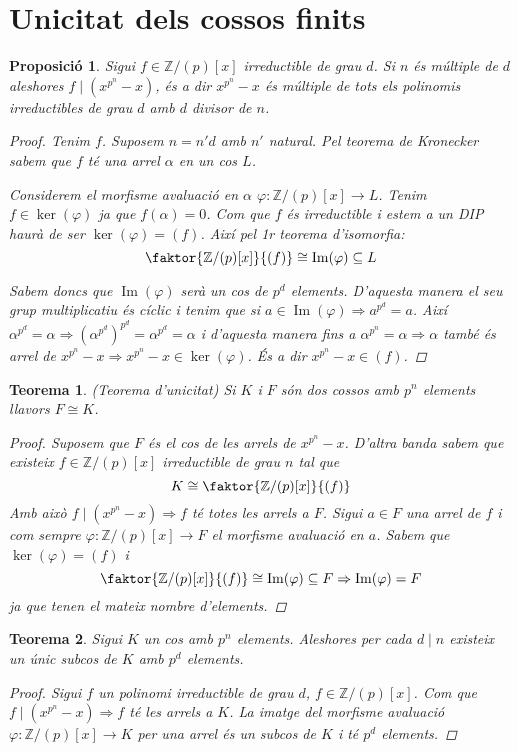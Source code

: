 \documentclass[a4paper,11pt]{report}
\renewcommand{\div}{\mid}
\newcommand{\im}{\Rightarrow}
\theoremstyle{theorem}
\newtheorem{proposicio}{\normalfont \sffamily\bfseries Proposició}[section]
\newtheorem{teorema}{\normalfont \sffamily\bfseries Teorema}[section]
\theoremstyle{definition}
\DeclareMathOperator{\ima}{Im}
\begin{document}
\section{Unicitat dels cossos finits}
\begin{proposicio}
	Sigui $f\in\mathbb{Z}/(p)[x]$ irreductible de grau $d$. Si $n$ és múltiple de $d$ aleshores $f\div (x^{p^n}-x)$, és a dir $x^{p^n}-x$ és múltiple de tots els polinomis irreductibles de grau $d$ amb $d$ divisor de $n$.\begin{proof}
	 Tenim $f$. Suposem $n=n'd$ amb $n'$ natural. Pel teorema de Kronecker sabem que $f$ té una arrel $\alpha$ en un cos $L$.
	 
	 Considerem el morfisme avaluació en $\alpha$ $\varphi: \mathbb{Z}/(p)[x]\longrightarrow L$. Tenim $f\in \ker(\varphi)$ ja que $f(\alpha)=0$. Com que $f$ és irreductible i estem a un DIP haurà de ser $\ker(\varphi)=(f)$. Així pel 1r teorema d'isomorfia:
	 $$\faktor{\mathbb{Z}/(p)[x]}{(f)}\cong \ima(\varphi)\subseteq L$$
	 
	 Sabem doncs que $\ima(\varphi)$ serà un cos de $p^d$ elements. D'aquesta manera el seu grup multiplicatiu és cíclic i tenim que si $a\in\ima(\varphi)\im a^{p^d}=a$. Així $\alpha^{p^d}=\alpha\im (\alpha^{p^d})^{p^d}= \alpha^{p^d}=\alpha$ i d'aquesta manera fins a $\alpha^{p^n}=\alpha\im \alpha$ també és arrel de $x^{p^n}-x\im x^{p^n}-x\in\ker(\varphi)$. És a dir $x^{p^n}-x\in (f)$.
	\end{proof}
\end{proposicio}
\begin{teorema}(Teorema d'unicitat)
 Si $K$ i $F$ són dos cossos amb $p^n$ elements llavors $F\cong K$.
 \begin{proof}
 	Suposem que $F$ és el cos de les arrels de $x^{p^n}-x$. D'altra banda sabem que existeix $f\in \mathbb{Z}/(p)[x]$ irreductible de grau $n$ tal que $$K\cong \faktor{\mathbb{Z}/(p)[x]}{(f)}$$
 	Amb això $f\div (x^{p^n}-x)\im f$ té totes les arrels a $F$. Sigui $a\in F$ una arrel de $f$ i com sempre $\varphi:\mathbb{Z}/(p)[x]\longrightarrow F$ el morfisme avaluació en $a$. Sabem que $\ker(\varphi)=(f)$ i $$\faktor{\mathbb{Z}/(p)[x]}{(f)}\cong\ima(\varphi)\subseteq F\im \ima(\varphi)=F$$ ja que tenen el mateix nombre d'elements.
 \end{proof}
\end{teorema}
\begin{teorema} Sigui $K$ un cos amb $p^n$ elements. Aleshores per cada $d\div n$ existeix un únic subcos de $K$ amb $p^d$ elements.
	\begin{proof}
Sigui $f$ un polinomi irreductible de grau $d$, $f\in \mathbb{Z}/(p)[x]$. Com que $f\div (x^{p^n}-x)\im f$ té les arrels a $K$. La imatge del morfisme avaluació $\varphi:\mathbb{Z}/(p)[x]\longrightarrow K$ per una arrel és un subcos de $K$ i té $p^d$ elements.
	\end{proof}
\end{teorema}
\end{document}
